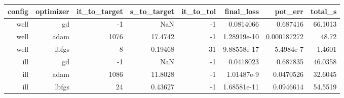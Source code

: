 \begin{tabular}{rrrrrrrr}
  \toprule
  \textbf{config} & \textbf{optimizer} & \textbf{it\_to\_target} & \textbf{s\_to\_target} & \textbf{it\_to\_tol} & \textbf{final\_loss} & \textbf{pot\_err} & \textbf{total\_s} \\
  \midrule
  well & gd & -1 & NaN & -1 & 0.0814066 & 0.687416 & 66.1013 \\
  well & adam & 1076 & 17.4742 & -1 & 1.28919e-10 & 0.000187272 & 48.72 \\
  well & lbfgs & 8 & 0.19468 & 31 & 9.88558e-17 & 5.4984e-7 & 1.4601 \\
  ill & gd & -1 & NaN & -1 & 0.0418023 & 0.687835 & 46.0358 \\
  ill & adam & 1086 & 11.8028 & -1 & 1.01487e-9 & 0.0470526 & 32.6045 \\
  ill & lbfgs & 24 & 0.43627 & -1 & 1.68581e-11 & 0.0946614 & 54.5519 \\
  \bottomrule
\end{tabular}
